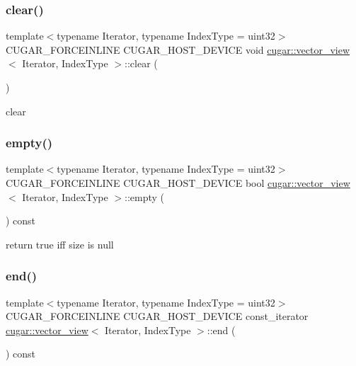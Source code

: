 \subsubsection{\texorpdfstring{clear()}{clear()}}
{\footnotesize\ttfamily template$<$typename Iterator, typename Index\+Type = uint32$>$ \\
C\+U\+G\+A\+R\+\_\+\+F\+O\+R\+C\+E\+I\+N\+L\+I\+NE C\+U\+G\+A\+R\+\_\+\+H\+O\+S\+T\+\_\+\+D\+E\+V\+I\+CE void \hyperlink{structcugar_1_1vector__view}{cugar\+::vector\+\_\+view}$<$ Iterator, Index\+Type $>$\+::clear (\begin{DoxyParamCaption}{ }\end{DoxyParamCaption})\hspace{0.3cm}{\ttfamily [inline]}}

clear \mbox{\label{structcugar_1_1vector__view_ac375abedf354fd94d74cf897ce63568f}} 
\subsubsection{\texorpdfstring{empty()}{empty()}}
{\footnotesize\ttfamily template$<$typename Iterator, typename Index\+Type = uint32$>$ \\
C\+U\+G\+A\+R\+\_\+\+F\+O\+R\+C\+E\+I\+N\+L\+I\+NE C\+U\+G\+A\+R\+\_\+\+H\+O\+S\+T\+\_\+\+D\+E\+V\+I\+CE bool \hyperlink{structcugar_1_1vector__view}{cugar\+::vector\+\_\+view}$<$ Iterator, Index\+Type $>$\+::empty (\begin{DoxyParamCaption}{ }\end{DoxyParamCaption}) const\hspace{0.3cm}{\ttfamily [inline]}}

return true iff size is null \mbox{\label{structcugar_1_1vector__view_ac19bc3ea1579b22053d0a91998026bc8}} 
\subsubsection{\texorpdfstring{end()}{end()}\hspace{0.1cm}{\footnotesize\ttfamily [1/2]}}
{\footnotesize\ttfamily template$<$typename Iterator, typename Index\+Type = uint32$>$ \\
C\+U\+G\+A\+R\+\_\+\+F\+O\+R\+C\+E\+I\+N\+L\+I\+NE C\+U\+G\+A\+R\+\_\+\+H\+O\+S\+T\+\_\+\+D\+E\+V\+I\+CE const\+\_\+iterator \hyperlink{structcugar_1_1vector__view}{cugar\+::vector\+\_\+view}$<$ Iterator, Index\+Type $>$\+::end (\begin{DoxyParamCaption}{ }\end{DoxyParamCaption}) const\hspace{0.3cm}{\ttfamily [inline]}}

